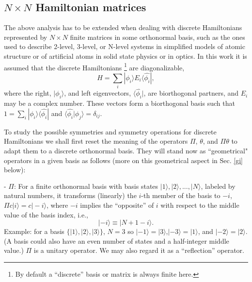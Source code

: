 %

%
%
%
\subsection{$N\times N$ Hamiltonian matrices}
%
%
The above analysis has to be extended when dealing with
discrete Hamiltonians represented by $N\times N$ finite matrices in some orthonormal basis, such as the ones used to describe 2-level, 3-level, or N-level systems in simplified models of atomic structure or of artificial atoms in solid state physics or in optics.
In this work it is assumed that  the  discrete Hamiltonians \footnote{By default a  ``discrete'' basis or matrix is always  finite here.} are diagonalizable,
%
\begin{equation}
H=\sum_{i} |\phi_{i}\rangle E_{i}\langle\widehat{\phi_{i}}|,
\end{equation}
%
where the right, $|\phi_{i}\rangle$, and left eigenvectors, $\langle \widehat{\phi_{i}}|$, are biorthogonal partners, and $E_i$ may be a complex number.
These vectors  form a biorthogonal basis such that  $1=\sum_i |\phi_{i}\rangle \langle\widehat{\phi_{i}}|$
and $\langle\widehat{\phi_{i}}|\phi_{j}\rangle=\delta_{ij}$.


To study the possible  symmetries and symmetry operations for discrete Hamiltonians we shall first reset  the meaning of the operators $\Pi$, $\theta$, and $\Pi\theta$ to adapt them to a discrete  orthonormal basis.
They will stand now  as ``geometrical" operators in a given basis as follows (more on this geometrical aspect in Sec. \ref{gi}
below):


- $\Pi$: For a finite orthonormal basis with basis states $|1\rangle, |2\rangle, ...,|N\rangle$,
labeled by  natural numbers, it transforms (linearly) the $i$-th member of the basis to $-i$, $\Pi c|i\rangle =c|-i\rangle $, where $-i$ implies the ``opposite'' of $i$ with respect to  the middle
value of the basis index, i.e.,
%
\begin{equation}
|-i\rangle\equiv|N+1-i\rangle.
\end{equation}
%
Example: for a  basis $\lbrace |1\rangle ,|2\rangle ,|3\rangle  \rbrace$, $N=3$ so $|-1\rangle =|3\rangle $,$|-3\rangle =|1\rangle $, and $|-2\rangle =|2\rangle $. (A basis could also have an even number of states and a half-integer middle value.) $\Pi$  is a unitary operator.  We may also regard it as a ``reflection'' operator.



